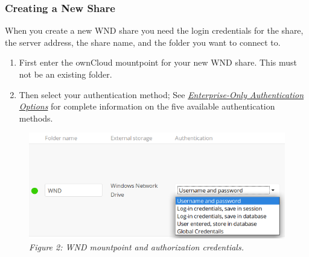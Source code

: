 \documentclass[letterpaper,10pt,english]{sphinxmanual}
\begin{document}
\subsubsection{Creating a New Share}
\label{enterprise_external_storage/windows-network-drive_configuration:creating-a-new-share}
When you create a new WND share you need the login credentials for the share,
the server address, the share name, and the folder you want to connect to.
\begin{enumerate}
\item {} 
First enter the ownCloud mountpoint for your new WND share. This must not be
an existing folder.

\item {} 
Then select your authentication method; See {\hyperref[enterprise_external_storage/enterprise_only_auth::doc]{\emph{Enterprise-Only Authentication Options}}} for
complete information on the five available authentication methods.

\end{enumerate}
\begin{figure}[htbp]
\centering
\capstart

\includegraphics{wnd-2.png}
\caption{\emph{Figure 2: WND mountpoint and authorization credentials.}}\end{figure}
\end{document}
